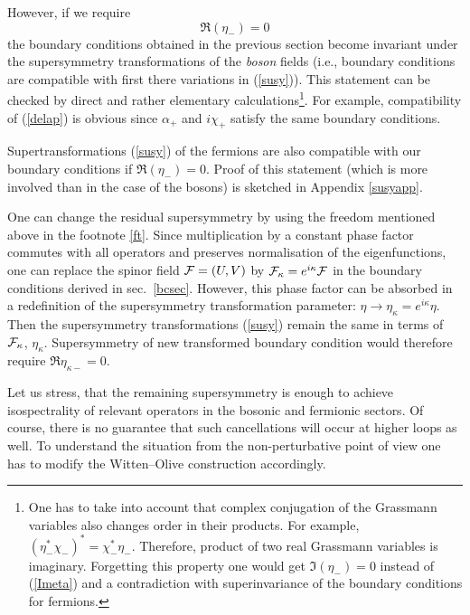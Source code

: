 \documentclass[a4paper,12pt]{article}
\begin{document}
However, if we require
\begin{equation}
\Re (\eta_-) =0 \label{Imeta}
\end{equation}
the boundary conditions obtained in the previous section
become invariant under the supersymmetry transformations
of the {\it boson} fields (i.e., boundary conditions are
compatible with first there variations in (\ref{susy})).
This statement can be checked by direct and rather elementary
calculations\footnote{One has to take into account that complex
conjugation of the Grassmann variables also changes order in their
products. For example, $(\eta^*_-\chi_-)^*=\chi_-^*\eta_-$.
Therefore, product of two real Grassmann variables is imaginary.
Forgetting this property one would get $\Im (\eta_-)=0$ instead
of (\ref{Imeta}) and a contradiction with superinvariance of the boundary
conditions for fermions.}. For example, compatibility of (\ref{delap})
is obvious since $\alpha_+$ and $i\chi_+$ satisfy the same
boundary conditions. 

Supertransformations (\ref{susy}) of the fermions are also compatible
with our boundary conditions if $\Re (\eta_-)=0$.
Proof of this statement (which is more involved than in the case of the bosons)
is sketched in Appendix \ref{susyapp}. 

One can change the residual supersymmetry
by using the freedom mentioned above
in the footnote \ref{ft}. Since multiplication by
a constant phase factor commutes with all operators and preserves 
normalisation of the eigenfunctions, one can replace the spinor
field ${\cal F}=(U,V)$ by ${\cal F}_\kappa =e^{i\kappa} {\cal F}$
in the boundary conditions derived in sec.\ \ref{bcsec}. However,
this phase factor can be absorbed in a redefinition of the
supersymmetry transformation parameter: 
$\eta\to\eta_\kappa=e^{i\kappa}\eta$. Then the supersymmetry 
transformations (\ref{susy}) remain the same in terms of 
${\cal F}_\kappa$, $\eta_\kappa$. Supersymmetry of new transformed
boundary condition would therefore require $\Re \eta_{\kappa -}=0$.

Let us stress, that the remaining supersymmetry is enough
 to achieve isospectrality of relevant
operators in the bosonic and fermionic sectors. 
Of course, there is no guarantee that such cancellations
will occur at higher loops as well. To understand the situation
from the non-perturbative point of view one has to modify the
Witten--Olive construction \cite{Witten:mh}  accordingly.

\end{document}
